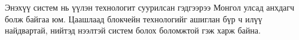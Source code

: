 \documentclass[12pt,A4]{report}
\begin{document}
Энэхүү систем нь үүлэн технологит суурилсан гэдгээрээ Монгол улсад анхдагч болж байгаа юм. Цаашлаад блокчейн технологийг ашиглан бүр ч илүү найдвартай, нийтэд нээлтэй систем болох боломжтой гэж харж байна.






\end{document}
